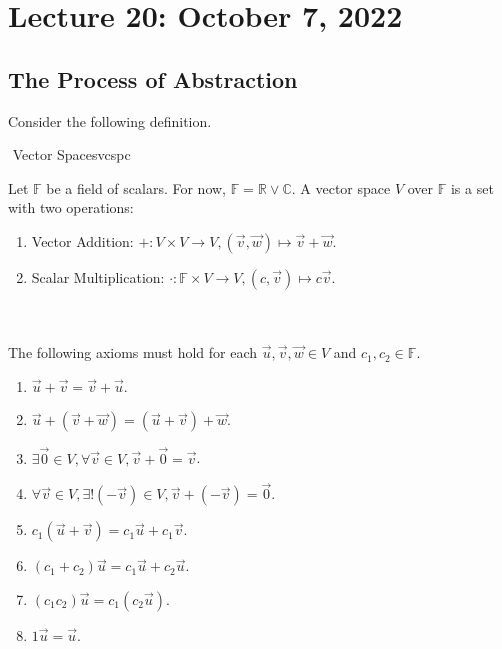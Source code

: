 \section{Lecture 20: October 7, 2022}

    \subsection{The Process of Abstraction}

        Consider the following definition.
        \begin{definition}{\Stop\,\,Vector Spaces}{vcspc}

            Let \(\mathbb{F}\) be a field of scalars. For now, \(\mathbb{F}=\mathbb{R}\vee\mathbb{C}\). A vector space \(V\) over \(\mathbb{F}\) is a set with two operations: 
            \begin{enumerate}
                \item Vector Addition: \(+:V\times V\to V, (\vec{v},\vec{w})\mapsto \vec{v}+\vec{w}\).
                \item Scalar Multiplication: \(\cdot:\mathbb{F}\times V\to V, (c,\vec{v})\mapsto c\vec{v}\).
            \end{enumerate}
            \vphantom
            \\
            \\
            The following axioms must hold for each \(\vec{u},\vec{v},\vec{w}\in V\) and \(c_1,c_2\in\mathbb{F}\).
            \begin{enumerate}
                \item \(\vec{u}+\vec{v}=\vec{v}+\vec{u}\).
                \item \(\vec{u}+(\vec{v}+\vec{w})=(\vec{u}+\vec{v})+\vec{w}\).
                \item \(\exists \vec{0}\in V, \forall \vec{v}\in V, \vec{v}+\vec{0}=\vec{v}\).
                \item \(\forall \vec{v}\in V, \exists! (-\vec{v})\in V, \vec{v}+(-\vec{v})=\vec{0}\).
                \item \(c_1(\vec{u}+\vec{v})=c_1\vec{u}+c_1\vec{v}\).
                \item \((c_1+c_2)\vec{u}=c_1\vec{u}+c_2\vec{u}\).
                \item \((c_1c_2)\vec{u}=c_1(c_2\vec{u})\).
                \item \(1\vec{u}=\vec{u}\).
            \end{enumerate}
            
        \end{definition}

